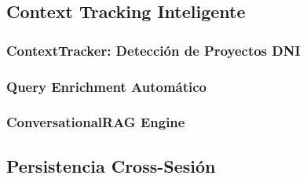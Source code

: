 \subsection{Context Tracking Inteligente}
\label{subsec:context-tracking}

\subsubsection{ContextTracker: Detecci\'on de Proyectos DNI}
\label{subsubsec:context-tracker-impl}


\subsubsection{Query Enrichment Autom\'atico}
\label{subsubsec:query-enrichment-impl}


\subsubsection{ConversationalRAG Engine}
\label{subsubsec:conversational-rag}


\subsection{Persistencia Cross-Sesi\'on}
\label{subsec:persistencia-cross-sesion}

